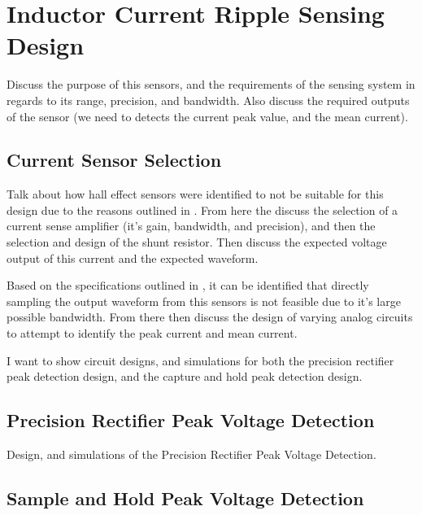 %
%

\section{Inductor Current Ripple Sensing Design}\label{S:current_sense_design}

Discuss the purpose of this sensors, and the requirements of the sensing system in regards to its range, precision, and bandwidth. Also discuss the required outputs of the sensor (we need to detects the current peak value, and the mean current).


\subsection{Current Sensor Selection}\label{S:current_sense_selection}

Talk about how hall effect sensors were identified to not be suitable for this design due to the reasons outlined in . From here the discuss the selection of a current sense amplifier (it's gain, bandwidth, and precision), and then the selection and design of the shunt resistor. Then discuss the expected voltage output of this current and the expected waveform. 


Based on the specifications outlined in , it can be identified that directly sampling the output waveform from this sensors is not feasible due to it's large possible bandwidth. From there then discuss the design of varying analog circuits to attempt to identify the peak current and mean current. 

I want to show circuit designs, and simulations for both the precision rectifier peak detection design, and the capture and hold peak detection design. 

\subsection{Precision Rectifier Peak Voltage Detection}\label{S:current_sense_precision_rectifier_design}

Design, and simulations of the Precision Rectifier Peak Voltage Detection.

\subsection{Sample and Hold Peak Voltage Detection}\label{S:current_sense_sample_and_hold_design}

